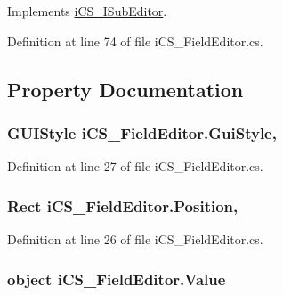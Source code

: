 Implements \hyperlink{interfacei_c_s___i_sub_editor_a724804497034baf9daa3df326d1b8a2f}{i\+C\+S\+\_\+\+I\+Sub\+Editor}.



Definition at line 74 of file i\+C\+S\+\_\+\+Field\+Editor.\+cs.



\subsection{Property Documentation}
\hypertarget{classi_c_s___field_editor_a86ed2a60a3e83dbceec0e6bff2c1c9ce}{
\subsubsection[{Gui\+Style}]{\setlength{\rightskip}{0pt plus 5cm}G\+U\+I\+Style i\+C\+S\+\_\+\+Field\+Editor.\+Gui\+Style\hspace{0.3cm}{\ttfamily [get]}, {\ttfamily [set]}}}\label{classi_c_s___field_editor_a86ed2a60a3e83dbceec0e6bff2c1c9ce}


Definition at line 27 of file i\+C\+S\+\_\+\+Field\+Editor.\+cs.

\hypertarget{classi_c_s___field_editor_acf081b49a25dddf86e1f007707653901}{
\subsubsection[{Position}]{\setlength{\rightskip}{0pt plus 5cm}Rect i\+C\+S\+\_\+\+Field\+Editor.\+Position\hspace{0.3cm}{\ttfamily [get]}, {\ttfamily [set]}}}\label{classi_c_s___field_editor_acf081b49a25dddf86e1f007707653901}


Definition at line 26 of file i\+C\+S\+\_\+\+Field\+Editor.\+cs.

\hypertarget{classi_c_s___field_editor_ac78f6b82993799dd4816fcef32329960}{
\subsubsection[{Value}]{\setlength{\rightskip}{0pt plus 5cm}object i\+C\+S\+\_\+\+Field\+Editor.\+Value\hspace{0.3cm}{\ttfamily [get]}}}\label{classi_c_s___field_editor_ac78f6b82993799dd4816fcef32329960}


